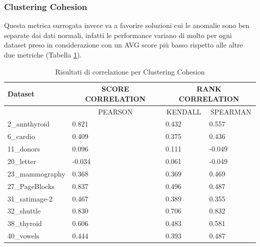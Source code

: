 \newpage
\subsubsection{Clustering Cohesion}
Questa metrica surrogata invece va a favorire soluzioni cui le anomalie sono ben separate dai dati normali, infatti le performance variano di molto per ogni dataset preso in considerazione con un AVG score più basso rispetto alle altre due metriche (Tabella \ref{cc-results}).


\begin{table}[]
	\caption{\label{cc-results}Risultati di correlazione per Clustering Cohesion}
		\begin{tabular}{|l|l|l|l|}
			\hline
			Dataset         & \multicolumn{1}{c|}{SCORE CORRELATION} & \multicolumn{2}{c|}{RANK CORRELATION}                         \\  \hline
			                & \multicolumn{1}{c|}{PEARSON} & \multicolumn{1}{c|}{KENDALL} & \multicolumn{1}{c|}{SPEARMAN} \\ \hline
			2\_annthyroid   & 0.821                        & 0.432                        & 0.557                         \\ \hline
			6\_cardio       & 0.409                        & 0.375                        & 0.436                         \\ \hline
			11\_donors      & 0.096                        & 0.111                        & -0.049                        \\ \hline
			20\_letter      & -0.034                       & 0.061                        & -0.049                        \\ \hline
			23\_mammography & 0.368                        & 0.369                        & 0.469                         \\ \hline
			27\_PageBlocks  & 0.837                        & 0.496                        & 0.487                         \\ \hline
			31\_satimage-2  & 0.467                        & 0.389                        & 0.355                         \\ \hline
			32\_shuttle     & 0.830                        & 0.706                        & 0.832                         \\ \hline
			38\_thyroid     & 0.606                        & 0.483                        & 0.581                         \\ \hline
			40\_vowels      & 0.444                        & 0.393                        & 0.487                         \\ \hline

\end{tabular}
\end{table}
